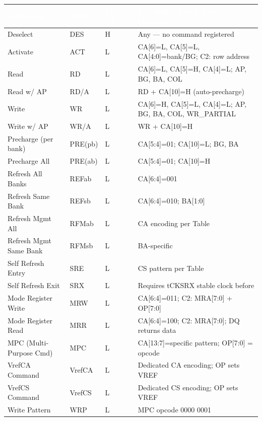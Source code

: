 \documentclass[10pt,a4paper,twoside]{article}
\newcommand{\thd}[1]{\cellcolor{navyblue}\textcolor{white}{\textbf{#1}}}
\newcommand{\trow}{\rowcolor{lightgray}}
\newcommand{\talt}{\rowcolor{skyblue!30}}
\begin{document}
\begin{center}
\begin{tabularx}{\linewidth}{@{} l l l X @{}}
\toprule
\thd{Command} & \thd{Abbr} & \thd{CS\_n C1} & \thd{CA[13:0] C1 Key Bits / Function} \\
\midrule
\trow Deselect & DES & H & Any --- no command registered \\
\talt Activate & ACT & L & CA[6]=L, CA[5]=L, CA[4:0]=bank/BG; C2: row address \\
\trow Read & RD & L & CA[6]=L, CA[5]=H, CA[4]=L; AP, BG, BA, COL \\
\talt Read w/ AP & RD/A & L & RD + CA[10]=H (auto-precharge) \\
\trow Write & WR & L & CA[6]=H, CA[5]=L, CA[4]=L; AP, BG, BA, COL, WR\_PARTIAL \\
\talt Write w/ AP & WR/A & L & WR + CA[10]=H \\
\trow Precharge (per bank) & PRE(pb) & L & CA[5:4]=01; CA[10]=L; BG, BA \\
\talt Precharge All & PRE(ab) & L & CA[5:4]=01; CA[10]=H \\
\trow Refresh All Banks & REFab & L & CA[6:4]=001 \\
\talt Refresh Same Bank & REFsb & L & CA[6:4]=010; BA[1:0] \\
\trow Refresh Mgmt All & RFMab & L & CA encoding per Table \\
\talt Refresh Mgmt Same Bank & RFMsb & L & BA-specific \\
\trow Self Refresh Entry & SRE & L & CS pattern per Table \\
\talt Self Refresh Exit & SRX & L & Requires tCKSRX stable clock before \\
\trow Mode Register Write & MRW & L & CA[6:4]=011; C2: MRA[7:0] + OP[7:0] \\
\talt Mode Register Read & MRR & L & CA[6:4]=100; C2: MRA[7:0]; DQ returns data \\
\trow MPC (Multi-Purpose Cmd) & MPC & L & CA[13:7]=specific pattern; OP[7:0] = opcode \\
\talt VrefCA Command & VrefCA & L & Dedicated CA encoding; OP sets VREF \\
\trow VrefCS Command & VrefCS & L & Dedicated CS encoding; OP sets VREF \\
\talt Write Pattern & WRP & L & MPC opcode 0000 0001 \\
\bottomrule
\end{tabularx}
\end{center}
\end{document}
